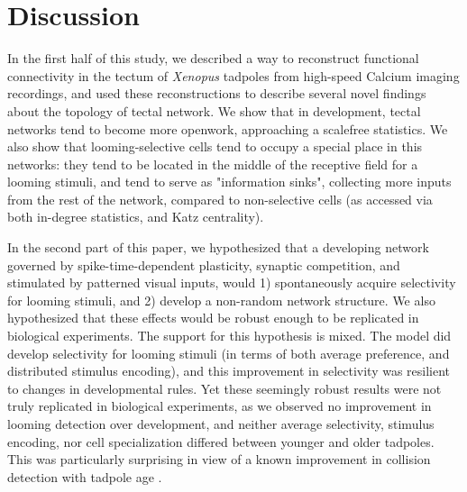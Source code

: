 \documentclass{article}
\begin{document}
\section*{Discussion}

In the first half of this study, we described a way to reconstruct functional connectivity in the tectum of \textit{Xenopus} tadpoles from high-speed Calcium imaging recordings, and used these reconstructions to describe several novel findings about the topology of tectal network. We show that in development, tectal networks tend to become more openwork, approaching a scalefree statistics. We also show that looming-selective cells tend to occupy a special place in this networks: they tend to be located in the middle of the receptive field for a looming stimuli, and tend to serve as "information sinks", collecting more inputs from the rest of the network, compared to non-selective cells (as accessed via both in-degree statistics, and Katz centrality).

In the second part of this paper, we hypothesized that a developing network governed by spike-time-dependent plasticity, synaptic competition, and stimulated by patterned visual inputs, would 1) spontaneously acquire selectivity for looming stimuli, and 2) develop a non-random network structure. We also hypothesized that these effects would be robust enough to be replicated in biological experiments. The support for this hypothesis is mixed. The model did develop selectivity for looming stimuli (in terms of both average preference, and distributed stimulus encoding), and this improvement in selectivity was resilient to changes in developmental rules. Yet these seemingly robust results were not truly replicated in biological experiments, as we observed no improvement in looming detection over development, and neither average selectivity, stimulus encoding, nor cell specialization differed between younger and older tadpoles. This was particularly surprising in view of a known improvement in collision detection with tadpole age \citep{dong2009}.
\end{document}
